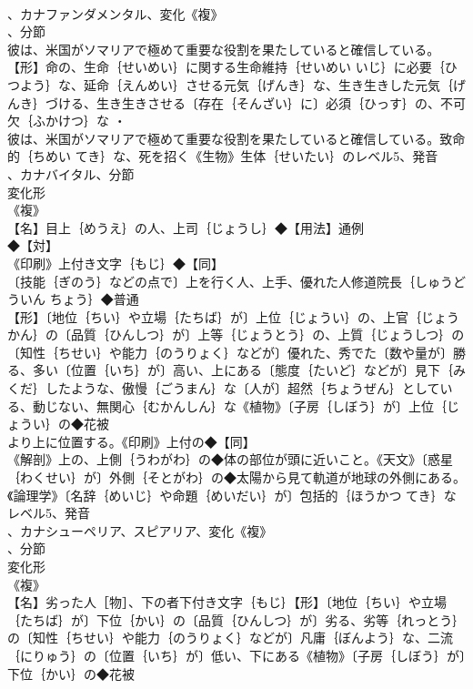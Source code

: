 \documentclass[8pt]{extreport}
\begin{document}
\begin{CJK}{UTF8}{min}
\\	、カナファンダメンタル、変化《複》
\\	、分節
\\	彼は、米国がソマリアで極めて重要な役割を果たしていると確信している。		【形】命の、生命｛せいめい｝に関する生命維持｛せいめい いじ｝に必要｛ひつよう｝な、延命｛えんめい｝させる元気｛げんき｝な、生き生きした元気｛げんき｝づける、生き生きさせる〔存在｛そんざい｝に〕必須｛ひっす｝の、不可欠｛ふかけつ｝な ・
\\	彼は、米国がソマリアで極めて重要な役割を果たしていると確信している。致命的｛ちめい てき｝な、死を招く《生物》生体｛せいたい｝のレベル5、発音
\\	、カナバイタル、分節
\\	変化形 
\\	《複》
\\	【名】目上｛めうえ｝の人、上司｛じょうし｝◆【用法】通例
\\	◆【対】
\\	《印刷》上付き文字｛もじ｝◆【同】
\\	〔技能｛ぎのう｝などの点で〕上を行く人、上手、優れた人修道院長｛しゅうどういん ちょう｝◆普通
\\	【形】〔地位｛ちい｝や立場｛たちば｝が〕上位｛じょうい｝の、上官｛じょうかん｝の〔品質｛ひんしつ｝が〕上等｛じょうとう｝の、上質｛じょうしつ｝の〔知性｛ちせい｝や能力｛のうりょく｝などが〕優れた、秀でた〔数や量が〕勝る、多い〔位置｛いち｝が〕高い、上にある〔態度｛たいど｝などが〕見下｛みくだ｝したような、傲慢｛ごうまん｝な〔人が〕超然｛ちょうぜん｝としている、動じない、無関心｛むかんしん｝な《植物》〔子房｛しぼう｝が〕上位｛じょうい｝の◆花被
\\	より上に位置する。《印刷》上付の◆【同】
\\	《解剖》上の、上側｛うわがわ｝の◆体の部位が頭に近いこと。《天文》〔惑星｛わくせい｝が〕外側｛そとがわ｝の◆太陽から見て軌道が地球の外側にある。《論理学》〔名辞｛めいじ｝や命題｛めいだい｝が〕包括的｛ほうかつ てき｝なレベル5、発音
\\	、カナシューペリア、スピアリア、変化《複》
\\	、分節
\\	変化形 
\\	《複》
\\	【名】劣った人［物］、下の者下付き文字｛もじ｝【形】〔地位｛ちい｝や立場｛たちば｝が〕下位｛かい｝の〔品質｛ひんしつ｝が〕劣る、劣等｛れっとう｝の〔知性｛ちせい｝や能力｛のうりょく｝などが〕凡庸｛ぼんよう｝な、二流｛にりゅう｝の〔位置｛いち｝が〕低い、下にある《植物》〔子房｛しぼう｝が〕下位｛かい｝の◆花被

\end{CJK}
\end{document}
